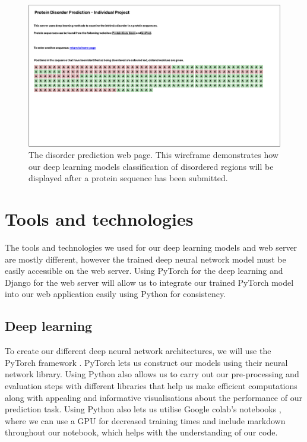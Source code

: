 \documentclass{l4proj}
\begin{document}
\begin{figure}
    \centering
    \includegraphics[width=\linewidth]{dissertation/images/Index - disorder prediction.pdf}
    
    \caption{The disorder prediction web page. This wireframe demonstrates how our deep learning models classification of disordered regions will be displayed after a protein sequence has been submitted.}
    
    \label{fig:wireframe2} 
\end{figure}

\section{Tools and technologies}

The tools and technologies we used for our deep learning models and web server are mostly different, however the trained deep neural network model must be easily accessible on the web server. Using PyTorch for the deep learning and Django for the web server will allow us to integrate our trained PyTorch model into our web application easily using Python for consistency.

\subsection{Deep learning}

To create our different deep neural network architectures, we will use the PyTorch framework \citep{pytorch}. PyTorch lets us construct our models using their neural network library. Using Python also allows us to carry out our pre-processing and evaluation steps with different libraries that help us make efficient computations along with appealing and informative visualisations about the performance of our prediction task. Using Python also lets us utilise Google colab’s notebooks \citep{Bisong:19}, where we can use a GPU for decreased training times and include markdown throughout our notebook, which helps with the understanding of our code.
\end{document}
